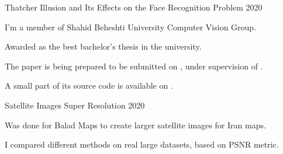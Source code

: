 

\begin{cvprojects}

  \cvproject
    {Thatcher Illusion and Its Effects on the Face Recognition Problem} %
    {} %
    {} %
    {2020} %
    {
      \begin{cvitems} %
        \item {I'm a member of Shahid Beheshti University Computer Vision Group.}
        \item {Awarded as the best bachelor's thesis in the university.}
        \item {The paper is being prepared to be submitted on , under supervision of .}
        \item {A small part of its source code is available on .}
      \end{cvitems}
    }

  \cvproject
    {Satellite Images Super Resolution} %
    {} %
    {} %
    {2020} %
    {
      \begin{cvitems} %
        \item {Was done for Balad Maps to create larger satellite images for Iran maps.}
        \item {I compared different methods on real large datasets, based on PSNR metric.}
      \end{cvitems}
    }


\end{cvprojects}
